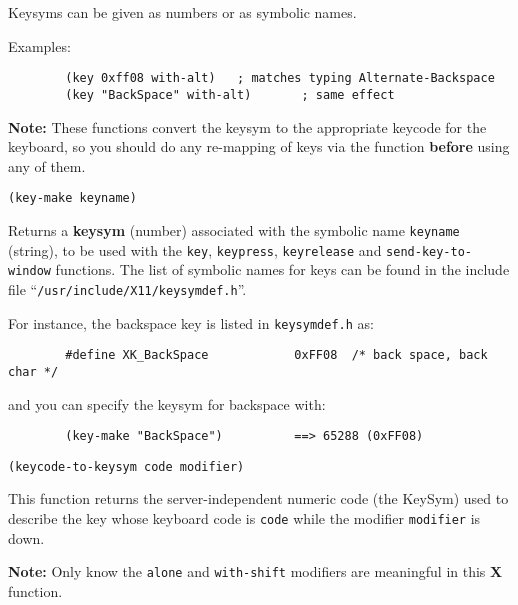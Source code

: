 Keysyms can be given as numbers or as symbolic names.

Examples:{\exemplefont\upspace\begin{verbatim}
        (key 0xff08 with-alt)   ; matches typing Alternate-Backspace
        (key "BackSpace" with-alt)       ; same effect
\end{verbatim}}

{\bf Note:} These functions convert the keysym to the appropriate keycode
for the keyboard, so you should do any re-mapping of keys via the
 function {\bf before} using any of them.


{\usagefont\begin{verbatim}
(key-make keyname)
\end{verbatim}}\usageupspace

Returns a {\bf keysym} (number) associated with the symbolic name
\verb"keyname" (string), to be used with the \verb"key", \verb"keypress",
\verb"keyrelease" and \verb"send-key-to-window" functions. The list of
symbolic names for keys can be found in the include file
``\verb"/usr/include/X11/keysymdef.h"''.

For instance, the backspace key is listed in \verb"keysymdef.h" as:
{\exemplefont\begin{verbatim}
        #define XK_BackSpace            0xFF08  /* back space, back char */
\end{verbatim}}
and you can specify the keysym for backspace with:
{\exemplefont\begin{verbatim}
        (key-make "BackSpace")          ==> 65288 (0xFF08)
\end{verbatim}}


{\usagefont\begin{verbatim}
(keycode-to-keysym code modifier)
\end{verbatim}}\usageupspace

This function returns the server-independent numeric code (the KeySym)
used to describe the key whose keyboard code is \verb"code" while the
modifier \verb"modifier" is down. 

{\bf Note:} Only know the \verb"alone" and \verb"with-shift" modifiers 
are meaningful in this {\bf X} function.


